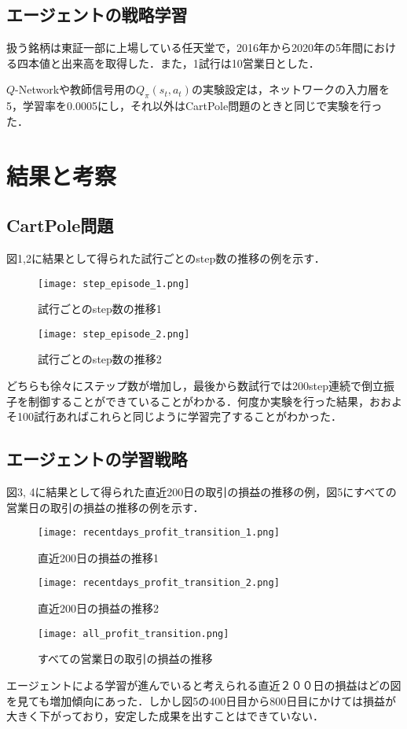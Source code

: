 \documentclass[twocolumn]{jarticle}
\begin{document}
        \subsection{エージェントの戦略学習}
        扱う銘柄は東証一部に上場している任天堂で，2016年から2020年の5年間における四本値と出来高を取得した．また，1試行は10営業日とした．
        
        $Q$-Networkや教師信号用の$Q_\pi(s_t,a_t)$の実験設定は，ネットワークの入力層を5，学習率を0.0005にし，それ以外はCartPole問題のときと同じで実験を行った．
    
\section{結果と考察}
        \subsection{CartPole問題}
        図1,2に結果として得られた試行ごとのstep数の推移の例を示す．
        \begin{figure}
            \texttt{[image: step\_episode\_1.png]}
            \caption{試行ごとのstep数の推移1}
        \end{figure}
        \begin{figure}
            \texttt{[image: step\_episode\_2.png]}
            \caption{試行ごとのstep数の推移2}
        \end{figure}
        どちらも徐々にステップ数が増加し，最後から数試行では200step連続で倒立振子を制御することができていることがわかる．何度か実験を行った結果，おおよそ100試行あればこれらと同じように学習完了することがわかった．

        \subsection{エージェントの学習戦略}
        図3, 4に結果として得られた直近200日の取引の損益の推移の例，図5にすべての営業日の取引の損益の推移の例を示す．
        \begin{figure}
            \texttt{[image: recentdays\_profit\_transition\_1.png]}
            \caption{直近200日の損益の推移1}
        \end{figure}
        \begin{figure}
            \texttt{[image: recentdays\_profit\_transition\_2.png]}
            \caption{直近200日の損益の推移2}
        \end{figure}
        \begin{figure}
            \texttt{[image: all\_profit\_transition.png]}
            \caption{すべての営業日の取引の損益の推移}
        \end{figure}
        エージェントによる学習が進んでいると考えられる直近２００日の損益はどの図を見ても増加傾向にあった．しかし図5の400日目から800日目にかけては損益が大きく下がっており，安定した成果を出すことはできていない．
        
\end{document}
